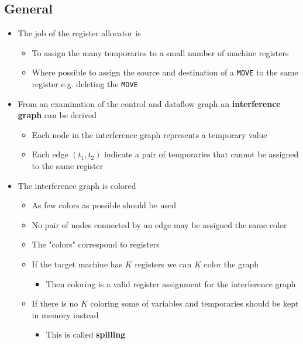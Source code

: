 \documentclass[11pt]{article}
\begin{document}
\subsection{General}
\label{sec:org908baa5}
\begin{itemize}
\item The job of the register allocator is
\begin{itemize}
\item To assign the many temporaries to a small number of machine registers
\item Where possible to assign the source and destination of a \texttt{MOVE} to the same register e.g. deleting the \texttt{MOVE}
\end{itemize}

\item From an examination of the control and dataflow graph an \textbf{interference graph} can be derived
\begin{itemize}
\item Each node in the interference graph represents a temporary value
\item Each edge \((t_1,t_2)\) indicate a pair of temporaries that cannot be assigned to the same register
\end{itemize}

\item The interference graph is colored
\begin{itemize}
\item As few colors as possible should be used
\item No pair of nodes connected by an edge may be assigned the same color
\item The "colors" correspond to registers
\item If the target machine has \(K\) registers we can \(K\) color the graph
\begin{itemize}
\item Then coloring is a valid register assignment for the interference graph
\end{itemize}
\item If there is no \(K\) coloring some of variables and temporaries should be kept in memory instead
\begin{itemize}
\item This is called \textbf{spilling}
\end{itemize}
\end{itemize}
\end{itemize}
\end{document}
